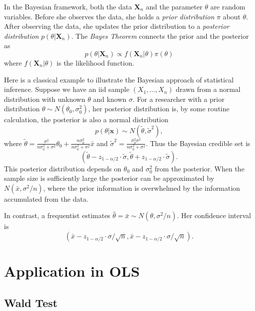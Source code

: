 \documentclass[11pt]{article}
\renewcommand{\hat}{\widehat}
\begin{document}
In the Bayesian framework, both the data $\mathbf{X}_n$ and the parameter $\theta$ are random variables.
Before she observes the data, she holds a \emph{prior distribution} $\pi$ about $\theta$.
After observing the data, she updates the prior distribution to a
\emph{posterior distribution} $p(\theta | \mathbf{X}_n)$. 
The \emph{Bayes Theorem} connects the prior and the posterior as
\[
p( \theta| \mathbf{X}_n ) \propto f( \mathbf{X}_n | \theta ) \pi(\theta)
\]
where $f( \mathbf{X}_n | \theta )$ is the likelihood function.




Here is a classical example to illustrate the Bayesian approach of statistical inference.
Suppose we have an iid sample $(X_1,\ldots,X_n)$ drawn from a normal distribution with 
unknown $\theta$ and known $\sigma$. For a researcher with a prior distribution 
$\theta \sim N(\theta_0, \sigma_0^2)$, her posterior distribution is,
by some routine calculation, the posterior is also a normal distribution
\[
p(\theta | \mathbf{x}) \sim N\left( \tilde{\theta}, \tilde{\sigma}^2   \right),
\]
where $ \tilde{\theta} = \frac{\sigma^2}{n \sigma_0^2 + \sigma^2} \theta_0 
+ \frac{n\sigma_0^2}{n\sigma_0^2 + \sigma^2} \bar{x} $ 
and $\tilde{\sigma}^2 = \frac{\sigma_0^2 \sigma^2}{n\sigma_0^2 + \sigma^2}$.
Thus the Bayesian credible set is 
\[
\left( \tilde{\theta} - z_{1-\alpha/2 } \cdot \tilde{\sigma},  \tilde{\theta} + z_{1-\alpha/2 }\cdot  \tilde{\sigma}  \right).
\]
This posterior distribution depends on $\theta_0$ and $\sigma_0^2$ from the posterior. 
When the sample size is sufficiently large 
the posterior can be approximated by $N( \bar{x}, \sigma^2 / n )$,
where the prior information is overwhelmed by the information accumulated from the data.

In contrast, a frequentist estimates $\hat{\theta} = \bar{x} \sim N(\theta, \sigma^2 / n) $. Her 
confidence interval is 
$$
\left( \bar{x} - z_{1-\alpha/2 } \cdot \sigma/\sqrt{n},  
\bar{x} - z_{1-\alpha/2 } \cdot \sigma/\sqrt{n} \right).
$$



\section{Application in OLS}\label{application-in-ols}

\subsection{Wald Test}\label{wald-test}
\end{document}
